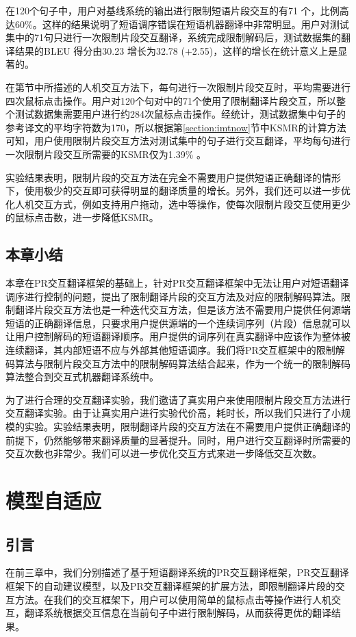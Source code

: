 \documentclass[master, winfont]{njuthesis}
\begin{document}
在120个句子中，用户对基线系统的输出进行限制短语片段交互的有71 个，比例高达$60\%$。这样的结果说明了短语调序错误在短语机器翻译中非常明显。用户对测试集中的71句只进行一次限制片段交互翻译，系统完成限制解码后，测试数据集的翻译结果的BLEU 得分由30.23 增长为32.78 (+2.55)，这样的增长在统计意义上是显著的。

在第\label{section:chosespan}节中所描述的人机交互方法下，每句进行一次限制片段交互时，平均需要进行四次鼠标点击操作。用户对120个句对中的71个使用了限制翻译片段交互，所以整个测试数据集需要用户进行约284次鼠标点击操作。经统计，测试数据集中句子的参考译文的平均字符数为170，所以根据第\ref{section:imtnow}节中KSMR的计算方法可知，用户使用限制片段交互方法对测试集中的句子进行交互翻译，平均每句进行一次限制片段交互所需要的KSMR仅为1.39\% 。

实验结果表明，限制片段的交互方法在完全不需要用户提供短语正确翻译的情形下，使用极少的交互即可获得明显的翻译质量的增长。另外，我们还可以进一步优化人机交互方式，例如支持用户拖动，选中等操作，使每次限制片段交互使用更少的鼠标点击数，进一步降低KSMR。

\section{本章小结}
本章在PR交互翻译框架的基础上，针对PR交互翻译框架中无法让用户对短语翻译调序进行控制的问题，提出了限制翻译片段的交互方法及对应的限制解码算法。限制翻译片段交互方法也是一种迭代交互方法，但是该方法不需要用户提供任何源端短语的正确翻译信息，只要求用户提供源端的一个连续词序列（片段）信息就可以让用户控制解码的短语翻译顺序。用户提供的词序列在真实翻译中应该作为整体被连续翻译，其内部短语不应与外部其他短语调序。我们将PR交互框架中的限制解码算法与限制片段交互方法中的限制解码算法结合起来，作为一个统一的限制解码算法整合到交互式机器翻译系统中。

为了进行合理的交互翻译实验，我们邀请了真实用户来使用限制片段交互方法进行交互翻译实验。由于让真实用户进行实验代价高，耗时长，所以我们只进行了小规模的实验。实验结果表明，限制翻译片段的交互方法在不需要用户提供正确翻译的前提下，仍然能够带来翻译质量的显著提升。同时，用户进行交互翻译时所需要的交互次数也非常少。我们可以进一步优化交互方式来进一步降低交互次数。

\chapter{模型自适应}
\section{引言}
在前三章中，我们分别描述了基于短语翻译系统的PR交互翻译框架，PR交互翻译框架下的自动建议模型，以及PR交互翻译框架的扩展方法，即限制翻译片段的交互方法。在我们的交互框架下，用户可以使用简单的鼠标点击等操作进行人机交互，翻译系统根据交互信息在当前句子中进行限制解码，从而获得更优的翻译结果。
\end{document}
